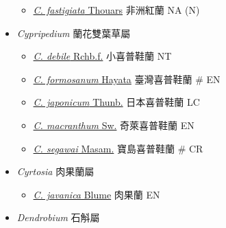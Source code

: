 \begin{itemize}
  \begin{itemize}
        \item[] \href{http://www.theplantlist.org/tpl1.1/search?q=Cynorchis+fastigiata}{\textit{C. fastigiata} Thouars}   非洲紅蘭   NA (N)
  \end{itemize}
 \item[] \textit{Cypripedium} 蘭花雙葉草屬
                                
  \begin{itemize}
        \item[] \href{http://www.theplantlist.org/tpl1.1/search?q=Cypripedium+debile}{\textit{C. debile} Rchb.f.}   小喜普鞋蘭   NT
        \item[] \href{http://www.theplantlist.org/tpl1.1/search?q=Cypripedium+formosanum}{\textit{C. formosanum} Hayata}   臺灣喜普鞋蘭  \# EN
        \item[] \href{http://www.theplantlist.org/tpl1.1/search?q=Cypripedium+japonicum}{\textit{C. japonicum} Thunb.}   日本喜普鞋蘭   LC
        \item[] \href{http://www.theplantlist.org/tpl1.1/search?q=Cypripedium+macranthum}{\textit{C. macranthum} Sw.}   奇萊喜普鞋蘭   EN
        \item[] \href{http://www.theplantlist.org/tpl1.1/search?q=Cypripedium+segawai}{\textit{C. segawai} Masam.}   寶島喜普鞋蘭  \# CR
  \end{itemize}
 \item[] \textit{Cyrtosia} 肉果蘭屬
                                
  \begin{itemize}
        \item[] \href{http://www.theplantlist.org/tpl1.1/search?q=Cyrtosia+javanica}{\textit{C. javanica} Blume}   肉果蘭   EN
  \end{itemize}
 \item[] \textit{Dendrobium} 石斛屬
                                

\end{itemize}
